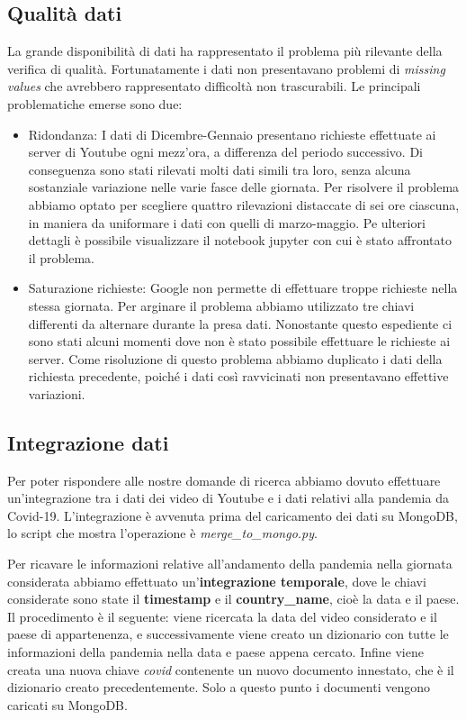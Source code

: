 \documentclass[10pt, a4paper,openany]{article}
\begin{document}
\subsection*{Qualità dati}
La grande disponibilità di dati ha rappresentato il problema più rilevante della verifica di qualità. Fortunatamente i dati non presentavano problemi di \textit{missing values} che avrebbero rappresentato difficoltà non trascurabili. Le principali problematiche emerse sono due:
\begin{itemize}
	
	\item Ridondanza: I dati di Dicembre-Gennaio presentano richieste effettuate ai server di Youtube ogni mezz'ora, a differenza del periodo successivo. Di conseguenza sono stati rilevati molti dati simili tra loro, senza alcuna sostanziale variazione nelle varie fasce delle giornata. Per risolvere il problema abbiamo optato per scegliere quattro rilevazioni distaccate di sei ore ciascuna, in maniera da uniformare i dati con quelli di marzo-maggio. Pe ulteriori dettagli è possibile visualizzare il notebook jupyter con cui è stato affrontato il problema.

	\item Saturazione richieste: Google non permette di effettuare troppe richieste nella stessa giornata. Per arginare il problema abbiamo utilizzato tre chiavi differenti da alternare durante la presa dati. Nonostante questo espediente ci sono stati alcuni momenti dove non è stato possibile effettuare le richieste ai server. Come risoluzione di questo problema abbiamo duplicato i dati della richiesta precedente, poiché i dati così ravvicinati non presentavano effettive variazioni.
	
	
\end{itemize}

\subsection*{Integrazione dati}
	Per poter rispondere alle nostre domande di ricerca abbiamo dovuto effettuare un'integrazione tra i dati dei video di Youtube e i dati relativi alla pandemia da Covid-19. L'integrazione è avvenuta prima del caricamento dei dati su MongoDB, lo script che mostra l'operazione è \textit{merge\_to\_mongo.py}. 
	
	Per ricavare le informazioni relative all'andamento della pandemia nella giornata considerata abbiamo effettuato un'\textbf{integrazione temporale}, dove le chiavi considerate sono state il \textbf{timestamp} e il \textbf{country\_name}, cioè la data e il paese. Il procedimento è il seguente: viene ricercata la data del video considerato e il paese di appartenenza, e successivamente viene creato un dizionario con tutte le informazioni della pandemia nella data e paese appena cercato. Infine viene creata una nuova chiave \textit{covid} contenente un nuovo documento innestato, che è il dizionario creato precedentemente. Solo a questo punto i documenti vengono caricati su MongoDB.
	
\end{document}
